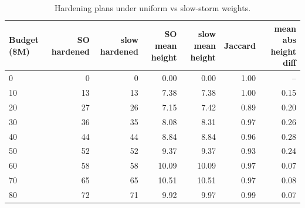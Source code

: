 \begin{table}[ht]
\centering
\caption{Hardening plans under uniform vs slow-storm weights.}
\label{tab:slow_storm_decisions}
\begin{tabular}{lrrrrrr}
\toprule
Budget (\$M) & SO hardened & slow hardened & SO mean height & slow mean height & Jaccard & mean abs height diff \\
\midrule
0 & 0 & 0 & 0.00 & 0.00 & 1.00 & -- \\
10 & 13 & 13 & 7.38 & 7.38 & 1.00 & 0.15 \\
20 & 27 & 26 & 7.15 & 7.42 & 0.89 & 0.20 \\
30 & 36 & 35 & 8.08 & 8.31 & 0.97 & 0.26 \\
40 & 44 & 44 & 8.84 & 8.84 & 0.96 & 0.28 \\
50 & 52 & 52 & 9.37 & 9.37 & 0.93 & 0.24 \\
60 & 58 & 58 & 10.09 & 10.09 & 0.97 & 0.07 \\
70 & 65 & 65 & 10.51 & 10.51 & 0.97 & 0.08 \\
80 & 72 & 71 & 9.92 & 9.97 & 0.99 & 0.07 \\
\bottomrule
\end{tabular}
\end{table}
